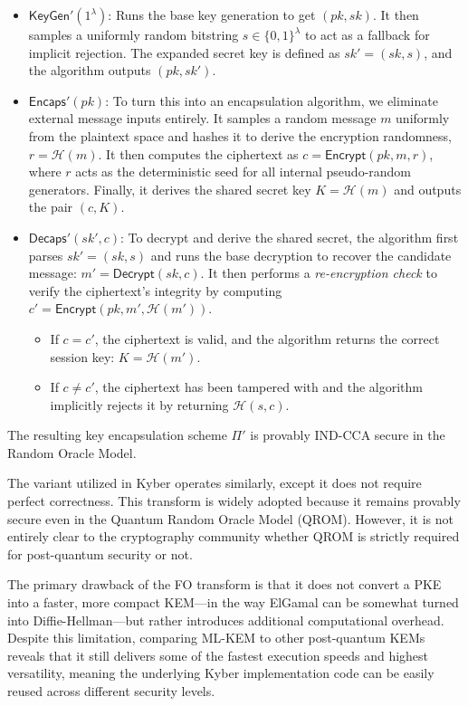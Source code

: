 \begin{itemize}
    \item $\mathsf{KeyGen}'(1^\lambda)$: Runs the base key generation to get $(pk, sk)$. It then samples a uniformly random bitstring $s \in \{0,1\}^\lambda$ to act as a fallback for implicit rejection. The expanded secret key is defined as $sk' = (sk, s)$, and the algorithm outputs $(pk, sk')$.
    
    \item $\mathsf{Encaps}'(pk)$: To turn this into an encapsulation algorithm, we eliminate external message inputs entirely. It samples a random message $m$ uniformly from the plaintext space and hashes it to derive the encryption randomness, $r = \mathcal{H}(m)$. It then computes the ciphertext as $c = \mathsf{Encrypt}(pk, m, r)$, where $r$ acts as the deterministic seed for all internal pseudo-random generators. Finally, it derives the shared secret key $K = \mathcal{H}(m)$ and outputs the pair $(c, K)$.
    
    \item $\mathsf{Decaps}'(sk', c)$: To decrypt and derive the shared secret, the algorithm first parses $sk' = (sk, s)$ and runs the base decryption to recover the candidate message: $m' = \mathsf{Decrypt}(sk, c)$. It then performs a \textit{re-encryption check} to verify the ciphertext's integrity by computing $c' = \mathsf{Encrypt}(pk, m', \mathcal{H}(m'))$. 
    \begin{itemize}
        \item If $c = c'$, the ciphertext is valid, and the algorithm returns the correct session key: $K = \mathcal{H}(m')$.
        \item If $c \neq c'$, the ciphertext has been tampered with and the algorithm implicitly rejects it by returning $\mathcal{H}(s, c)$.
    \end{itemize}
\end{itemize}

The resulting key encapsulation scheme $\Pi'$ is provably IND-CCA secure in the Random Oracle Model.

The variant utilized in Kyber operates similarly, except it does not require perfect correctness. This transform is widely adopted because it remains provably secure even in the Quantum Random Oracle Model (QROM). However, it is not entirely clear to the cryptography community whether QROM is strictly required for post-quantum security or not.

The primary drawback of the FO transform is that it does not convert a PKE into a faster, more compact KEM—in the way ElGamal can be somewhat turned into Diffie-Hellman—but rather introduces additional computational overhead. Despite this limitation, comparing ML-KEM to other post-quantum KEMs reveals that it still delivers some of the fastest execution speeds and highest versatility, meaning the underlying Kyber implementation code can be easily reused across different security levels.

